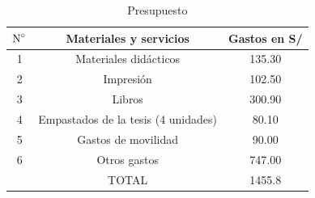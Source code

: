 \documentclass[12pt,a4paper]{article}
\begin{document}
\begin{table}[ht!]
	\caption{Presupuesto}\label{presup}
	\begin{tabular}{|c|c|c|}\hline
		$\text N^\circ$ & Materiales y servicios              & {Gastos en S/} \\\hline
		1               & Materiales didácticos               & 135.30         \\\hline
		2               & Impresión                           & 102.50         \\\hline
		3               & Libros                              & 300.90         \\\hline
		4               & Empastados de la tesis (4 unidades) & 80.10          \\\hline
		5               & Gastos de movilidad                 & 90.00          \\\hline
		6               & Otros gastos                        & 747.00         \\\hline
		                & TOTAL                               & 1455.8         \\
		\hline
	\end{tabular}
\end{table}
\end{document}
